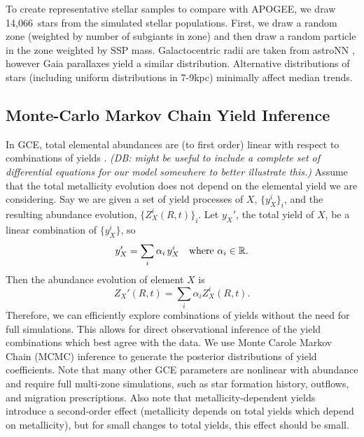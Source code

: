 \documentclass[fleqn,
referee, %
usenatbib]{mnras}
\newcommand{\nsubgiants}{14,066}
\newcommand{\dbnote}[1]{ {\color{Thistle} \textit{\small (DB: #1)}} }
\begin{document}
To create representative stellar samples to compare with APOGEE, 
we draw \nsubgiants\ stars from the simulated stellar populations. First, we draw a random zone (weighted by number of subgiants in zone) and then draw a random particle in the zone weighted by SSP mass.
Galactocentric radii are taken from astroNN \citep{leung+bovy19, leung+bovy19b}, however Gaia parallaxes yield a similar distribution. Alternative distributions of stars (including uniform distributions in 7-9kpc) minimally affect median trends.

\subsection{Monte-Carlo Markov Chain Yield Inference} \label{sec:mcmc_methods}

In GCE, total elemental abundances are (to first order) linear with respect to combinations of yields \citep[e.g.][]{WAF17}.
\dbnote{might be useful to include a complete set of differential equations for our model somewhere to better illustrate this.}
Assume that the total metallicity evolution does not depend on the elemental yield we are considering.
Say we are given a set of yield processes of $X$, $\{y_X^i\}_i$, and the resulting abundance evolution, $\{Z_{X}^i(R, t) \}_i$. Let $y_X'$, the total yield of $X$, be a linear combination of $\{y_X^i\}$, so
\begin{equation}
    y_X' = \sum_i \alpha_i\, y_X^i \quad {\rm where\ } \alpha_i \in \mathbb{R}.
\end{equation}
Then the abundance evolution of element $X$ is
\begin{equation}\label{eq:lin_combo}
    Z_X'(R, t) = \sum_i \alpha_i Z_X^i(R, t).
\end{equation}
Therefore, we can efficiently explore combinations of yields without the need for full simulations. This allows for direct observational inference of the yield combinations which best agree with the data.
We use Monte Carole Markov Chain (MCMC) inference to generate the posterior distributions of yield coefficients. Note that many other GCE parameters are nonlinear with abundance and require full multi-zone simulations, such as star formation history, outflows, and migration prescriptions. 
Also note that metallicity-dependent yields introduce a second-order effect (metallicity depends on total yields which depend on metallicity), but for small changes to total yields, this effect should be small.
\end{document}
